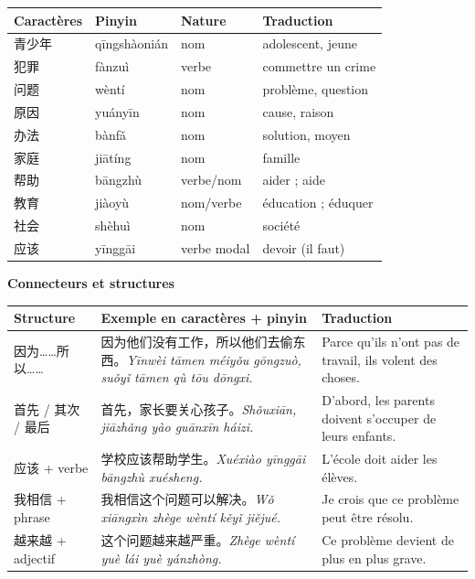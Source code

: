 \documentclass[11pt]{article}
\begin{document}
\begin{center}
\begin{tabularx}{\linewidth}{|X|X|X|X|}
\hline
\rowcolor{popblueL} Caractères & Pinyin & Nature & Traduction \\
\hline
青少年 & qīngshàonián & nom & adolescent, jeune \\
\hline
犯罪 & fànzuì & verbe & commettre un crime \\
\hline
问题 & wèntí & nom & problème, question \\
\hline
原因 & yuányīn & nom & cause, raison \\
\hline
办法 & bànfǎ & nom & solution, moyen \\
\hline
家庭 & jiātíng & nom & famille \\
\hline
帮助 & bāngzhù & verbe/nom & aider ; aide \\
\hline
教育 & jiàoyù & nom/verbe & éducation ; éduquer \\
\hline
社会 & shèhuì & nom & société \\
\hline
应该 & yīnggāi & verbe modal & devoir (il faut) \\
\hline
\end{tabularx}
\end{center}

\textbf{Connecteurs et structures}

\begin{center}
\begin{tabularx}{\linewidth}{|X|X|X|}
\hline
\rowcolor{popblueL} Structure & Exemple en caractères + pinyin & Traduction \\
\hline
因为……所以…… & 因为他们没有工作，所以他们去偷东西。\emph{Yīnwèi tāmen méiyǒu gōngzuò, suǒyǐ tāmen qù tōu dōngxi.} & Parce qu'ils n'ont pas de travail, ils volent des choses. \\
\hline
首先 / 其次 / 最后 & 首先，家长要关心孩子。\emph{Shǒuxiān, jiāzhǎng yào guānxīn háizi.} & D'abord, les parents doivent s'occuper de leurs enfants. \\
\hline
应该 + verbe & 学校应该帮助学生。\emph{Xuéxiào yīnggāi bāngzhù xuésheng.} & L'école doit aider les élèves. \\
\hline
我相信 + phrase & 我相信这个问题可以解决。\emph{Wǒ xiāngxìn zhège wèntí kěyǐ jiějué.} & Je crois que ce problème peut être résolu. \\
\hline
越来越 + adjectif & 这个问题越来越严重。\emph{Zhège wèntí yuè lái yuè yánzhòng.} & Ce problème devient de plus en plus grave. \\
\hline
\end{tabularx}
\end{center}
\end{document}
